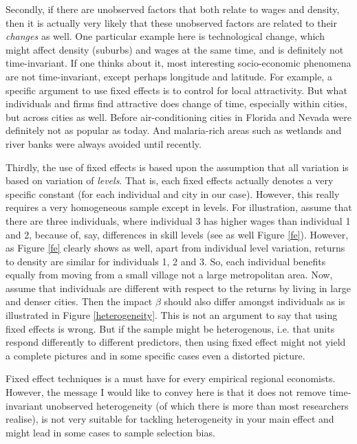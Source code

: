 \documentclass[fleqn,10pt]{SelfArx} %
\begin{document}
Secondly, if there are unobserved factors that both relate to wages and density,
then it is actually very likely that these unobserved factors are related to
their \emph{changes} as well. One particular example here is technological
change, which might affect density (suburbs) and wages at the same time, and is
definitely not time-invariant. If one thinks about it, most interesting
socio-economic phenomena are not time-invariant, except perhaps longitude and
latitude. For example, a specific argument to use fixed effects is to control
for local attractivity. But what individuals and firms find attractive does
change of time, especially within cities, but across cities as well. Before
air-conditioning cities in Florida and Nevada were definitely not as popular as
today. And malaria-rich areas such as wetlands and river banks were always
avoided until recently.   

Thirdly, the use of fixed effects is based upon the assumption that all
variation is based on variation of \emph{levels}. That is, each fixed effects
actually denotes a very specific constant (for each individual and city in our
case). However, this really requires a very homogeneous sample except in levels.
For illustration, assume that there are three individuals, where individual 3
has higher wages than individual 1 and 2, because of, say, differences in skill
levels (see as well Figure \ref{fe}). However, as Figure \ref{fe} clearly shows
as well, apart from individual level variation, returns to density are similar
for individuals 1, 2 and 3. So, each individual benefits equally from moving
from a small village not a large metropolitan area. Now, assume that individuals
are different with respect to the returns by living in large and denser cities.
Then the impact $\beta$ should also differ amongst individuals as is illustrated
in Figure \ref{heterogeneity}. This is not an argument to say that using fixed
effects is wrong. But if the sample might be heterogenous, i.e. that
units respond differently to different predictors, then using fixed effect might
not yield a complete pictures and in some specific cases even a distorted picture. 

Fixed effect techniques is a must have for every empirical regional economists.
However, the message I would like to convey here is that it does not remove
time-invariant unobserved heterogeneity (of which there is more than most
researchers realise), is not very suitable for tackling heterogeneity in your
main effect and might lead in some cases to sample selection bias.
\end{document}
